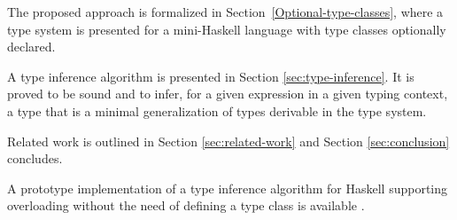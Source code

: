 The proposed approach is formalized in
Section~\ref{Optional-type-classes}, where a type system is presented
for a mini-Haskell language with type classes optionally declared.


A type inference algorithm is presented in Section
\ref{sec:type-inference}. It is proved to be sound and to infer, for a
given expression in a given typing context, a type that is a minimal
generalization of types derivable in the type system.


Related work is outlined in Section \ref{sec:related-work} and Section
\ref{sec:conclusion} concludes.


A prototype implementation of a type inference algorithm for Haskell
supporting overloading without the need of defining a type class is
available \cite{opt-rep}.
